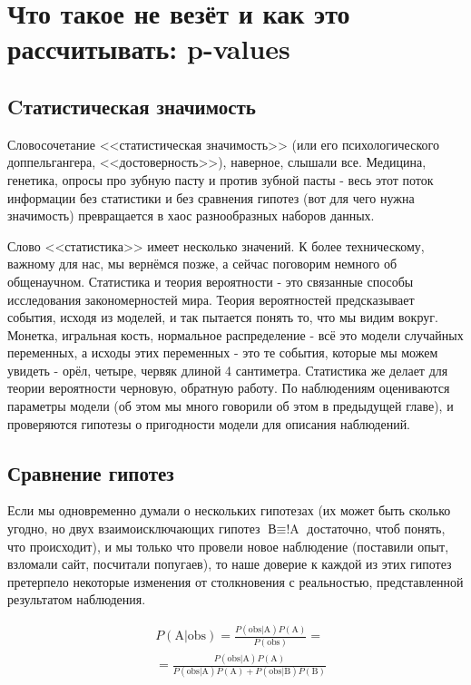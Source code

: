 \documentclass{book}
\begin{document}

\chapter[Что такое не везёт: p-values]{Что такое не везёт и как это рассчитывать: p-values}

\section*{Cтатистическая значимость}

Словосочетание <<статистическая значимость>> (или его психологического доппельгангера, <<достоверность>>), наверное, слышали все. Медицина, генетика, опросы про зубную пасту и против зубной пасты - весь этот поток информации без статистики и без сравнения гипотез (вот для чего нужна значимость) превращается в хаос разнообразных наборов данных.

Слово <<статистика>> имеет несколько значений. К более техническому, важному для нас, мы вернёмся позже, а сейчас поговорим немного об общенаучном. Статистика и теория вероятности - это связанные способы исследования закономерностей мира. Теория вероятностей предсказывает события, исходя из моделей, и так пытается понять то, что мы видим вокруг. Монетка, игральная кость, нормальное распределение - всё это модели случайных переменных, а исходы этих переменных - это те события, которые мы можем увидеть - орёл, четыре, червяк длиной 4 сантиметра. Статистика же делает для теории вероятности черновую, обратную работу. По наблюдениям оцениваются параметры модели (об этом мы много говорили об этом в предыдущей главе), и проверяются гипотезы о пригодности модели для описания наблюдений. 

\section*{Сравнение гипотез}

Если мы одновременно думали о нескольких гипотезах (их может быть сколько угодно, но двух взаимоисключающих гипотез $\text{В} \equiv \text{!A}$ достаточно, чтоб понять, что происходит), и мы только что провели новое наблюдение  (поставили опыт, взломали сайт, посчитали попугаев), то наше доверие к каждой из этих гипотез претерпело некоторые изменения от столкновения с реальностью, представленной результатом наблюдения.  

\begin{align}\label{hyp_compare_bayes_A}
   &P\left(\text{A|obs}\right)=
   \frac{P\left(\text{obs|A}\right) P\left(\text{A}\right)}{P\left(\text{obs}\right)} = \nonumber \\
   &=\frac{P\left(\text{obs|A}\right) P\left(\text{A}\right)}{P\left(\text{obs|A}\right) P\left(\text{A}\right)+P\left(\text{obs|B}\right) P\left(\text{B}\right)} 
\end{align}
\end{document}
